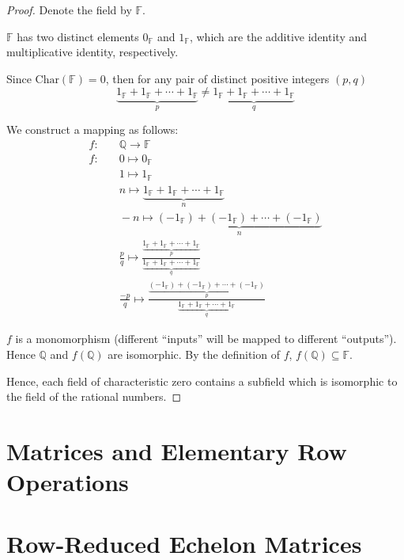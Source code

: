 \begin{proof}
    Denote the field by $\mathbb{F}$.

    $\mathbb{F}$ has two distinct elements $0_{\mathbb{F}}$ and $1_{\mathbb{F}}$, which are the additive identity and multiplicative identity, respectively.

    Since $\text{Char}(\mathbb{F}) = 0$, then for any pair of distinct positive integers $(p, q)$
    \[
        \underbrace{1_{\mathbb{F}} + 1_{\mathbb{F}} + \cdots + 1_{\mathbb{F}}}_{p} \ne \underbrace{1_{\mathbb{F}} + 1_{\mathbb{F}} + \cdots + 1_{\mathbb{F}}}_{q}
    \]

    We construct a mapping as follows:
    \[
        \begin{split}
            f:&\quad\mathbb{Q} \to \mathbb{F} \\
            f:&\quad 0 \mapsto 0_{\mathbb{F}} \\
            &\quad 1 \mapsto 1_{\mathbb{F}} \\
            &\quad n \mapsto \underbrace{1_{\mathbb{F}} + 1_{\mathbb{F}} + \cdots + 1_{\mathbb{F}}}_{n} \\
            &\quad -n \mapsto \underbrace{(-1_{\mathbb{F}}) + (-1_{\mathbb{F}}) + \cdots + (-1_{\mathbb{F}})}_{n} \\
            &\quad \frac{p}{q} \mapsto \frac{\underbrace{1_{\mathbb{F}} + 1_{\mathbb{F}} + \cdots + 1_{\mathbb{F}}}_{p}}{\underbrace{1_{\mathbb{F}} + 1_{\mathbb{F}} + \cdots + 1_{\mathbb{F}}}_{q}} \\
            &\quad \frac{-p}{q} \mapsto \frac{\underbrace{(-1_{\mathbb{F}}) + (-1_{\mathbb{F}}) + \cdots + (-1_{\mathbb{F}})}_{p}}{\underbrace{1_{\mathbb{F}} + 1_{\mathbb{F}} + \cdots + 1_{\mathbb{F}}}_{q}}
        \end{split}
    \]

    $f$ is a monomorphism (different ``inputs'' will be mapped to different ``outputs''). Hence $\mathbb{Q}$ and $f(\mathbb{Q})$ are isomorphic. By the definition of $f$, $f(\mathbb{Q})\subseteq\mathbb{F}$.

    Hence, each field of characteristic zero contains a subfield which is isomorphic to the field of the rational numbers.
\end{proof}

\section{Matrices and Elementary Row Operations}

\section{Row-Reduced Echelon Matrices}

